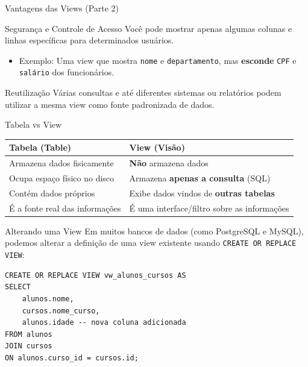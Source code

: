 \documentclass[9pt]{beamer}
\begin{document}
\begin{frame}{Vantagens das Views (Parte 2)}
    \begin{block}{Segurança e Controle de Acesso}
        Você pode mostrar apenas algumas colunas e linhas específicas para determinados usuários.
        \begin{itemize}
            \item Exemplo: Uma view que mostra \texttt{nome} e \texttt{departamento}, mas \textbf{esconde} \texttt{CPF} e \texttt{salário} dos funcionários.
        \end{itemize}
    \end{block}
    
    \vspace{0.5cm}
    
    \begin{block}{Reutilização}
        Várias consultas e até diferentes sistemas ou relatórios podem utilizar a mesma view como fonte padronizada de dados.
    \end{block}
\end{frame}

\begin{frame}{Tabela vs View}
    \begin{center}
        \renewcommand{\arraystretch}{1.5}
        \begin{tabular}{|l|l|}
            \hline
            \textbf{Tabela (Table)} & \textbf{View (Visão)} \\
            \hline
            Armazena dados fisicamente & \textbf{Não} armazena dados \\
            \hline
            Ocupa espaço físico no disco & Armazena \textbf{apenas a consulta} (SQL) \\
            \hline
            Contém dados próprios & Exibe dados vindos de \textbf{outras tabelas} \\
            \hline
            É a fonte real das informações & É uma interface/filtro sobre as informações \\
            \hline
        \end{tabular}
    \end{center}
\end{frame}

\begin{frame}[fragile]{Alterando uma View}
    Em muitos bancos de dados (como PostgreSQL e MySQL), podemos alterar a definição de uma view existente usando \texttt{CREATE OR REPLACE VIEW}:
    
    \begin{lstlisting}
CREATE OR REPLACE VIEW vw_alunos_cursos AS
SELECT
    alunos.nome,
    cursos.nome_curso,
    alunos.idade -- nova coluna adicionada
FROM alunos
JOIN cursos
ON alunos.curso_id = cursos.id;
    \end{lstlisting}
\end{frame}
\end{document}
